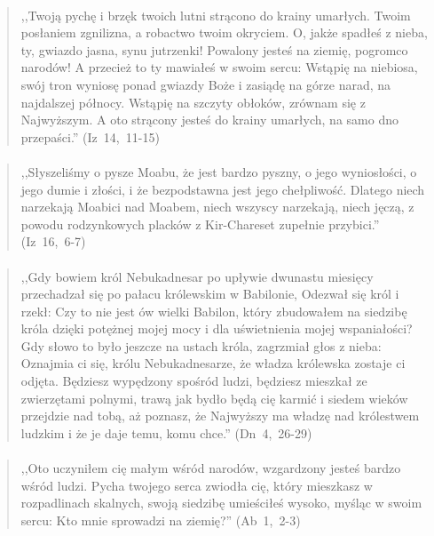 \documentclass[10pt,a4paper,oneside]{article}
\begin{document}
\paragraph{}
\begin{quote}
,,Twoją pychę i brzęk twoich lutni strącono do krainy umarłych. Twoim posłaniem zgnilizna, a robactwo twoim okryciem. O, jakże spadłeś z nieba, ty, gwiazdo jasna, synu jutrzenki! Powalony jesteś na ziemię, pogromco narodów! A przecież to ty mawiałeś w swoim sercu: Wstąpię na niebiosa, swój tron wyniosę ponad gwiazdy Boże i zasiądę na górze narad, na najdalszej północy. Wstąpię na szczyty obłoków, zrównam się z Najwyższym. A oto strącony jesteś do krainy umarłych, na samo dno przepaści.'' \mbox{(Iz 14, 11-15)}
\end{quote}
\paragraph{}
\begin{quote}
,,Słyszeliśmy o pysze Moabu, że jest bardzo pyszny, o jego wyniosłości, o jego dumie i złości, i że bezpodstawna jest jego chełpliwość. Dlatego niech narzekają Moabici nad Moabem, niech wszyscy narzekają, niech jęczą, z powodu rodzynkowych placków z Kir-Chareset zupełnie przybici.'' \mbox{(Iz 16, 6-7)}
\end{quote}
\paragraph{}
\begin{quote}
,,Gdy bowiem król Nebukadnesar po upływie dwunastu miesięcy przechadzał się po pałacu królewskim w Babilonie, Odezwał się król i rzekł: Czy to nie jest ów wielki Babilon, który zbudowałem na siedzibę króla dzięki potężnej mojej mocy i dla uświetnienia mojej wspaniałości? Gdy słowo to było jeszcze na ustach króla, zagrzmiał głos z nieba: Oznajmia ci się, królu Nebukadnesarze, że władza królewska zostaje ci odjęta. Będziesz wypędzony spośród ludzi, będziesz mieszkał ze zwierzętami polnymi, trawą jak bydło będą cię karmić i siedem wieków przejdzie nad tobą, aż poznasz, że Najwyższy ma władzę nad królestwem ludzkim i że je daje temu, komu chce.'' \mbox{(Dn 4, 26-29)}
\end{quote}
\paragraph{}
\begin{quote}
,,Oto uczyniłem cię małym wśród narodów, wzgardzony jesteś bardzo wśród ludzi. Pycha twojego serca zwiodła cię, który mieszkasz w rozpadlinach skalnych, swoją siedzibę umieściłeś wysoko, myśląc w swoim sercu: Kto mnie sprowadzi na ziemię?'' \mbox{(Ab 1, 2-3)}
\end{quote}
\end{document}
